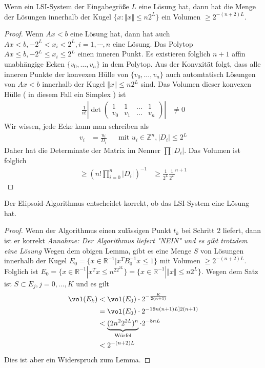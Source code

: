 \begin{lemma}
Wenn ein LSI-System der Eingabegröße $L$ eine Lösung hat, dann hat die Menge der Lösungen innerhalb der Kugel $\{x:\Vert x \Vert \leq n2^L \}$ ein Volumen $\geq 2^{-(n+2)L}$.
\end{lemma}
\begin{proof}
Wenn $Ax < b$ eine Lösung hat, dann hat auch $Ax<b, -2^L< x_i < 2^L, i = 1,\cdots,n$ eine Lösung.
Das Polytop $Ax \leq b, -2^L \leq x_i \leq 2^L$ einen inneren Punkt.
Es existieren folglich $n+1$ affin unabhängige Ecken $\{v_0,\dotsc, v_n\}$ in dem Polytop.
Aus der Konvxität folgt, dass alle inneren Punkte der konvexen Hülle von $\{v_0,\dotsc, v_n\}$ auch automtatisch Lösungen von $Ax < b$ innerhalb der Kugel $\Vert x \Vert \leq n2^L$ sind.
Das Volumen dieser konvexen Hülle ( in diesem Fall ein Simplex ) ist
\begin{align*}
\frac{1}{n!} \left \lvert \det \begin{pmatrix}
1 & 1 & \hdots &1 \\
v_0 & v_1 & \hdots & v_n 
\end{pmatrix} \right \rvert &\neq 0
\end{align*}
Wir wissen, jede Ecke kann man schreiben als
\begin{align*}
v_i &= \frac{u_i}{D_i} && \text{mit } u_i \in \mathbb Z^n, \lvert D_i \rvert \leq 2^L
\end{align*}
Daher hat die Determinate der Matrix im Nenner $\prod \lvert D_i \rvert$.
Das Volumen ist folglich 
\begin{align*}
\geq (n! \prod_{i=0}^n \lvert D_i \rvert )^{-1} &\geq \frac{1}{2^L}\frac{1}{2^L}^{n+1}
\end{align*}
\end{proof}
\begin{theorem}
Der Elipsoid-Algorithmus entscheidet korrekt, ob das LSI-System eine Lösung hat.
\end{theorem}
\begin{proof}
Wenn der Algorithmus einen zulässigen Punkt $t_k$ bei Schritt 2 liefert, dann ist er korrekt\newline
\emph{Annahme: Der Algorithmus liefert "NEIN" und es gibt trotzdem eine Lösung}\newline
Wegen dem obigen Lemma, gibt es eine Menge $S$ von Lösungen innerhalb der Kugel $E_0 = \{x\in \mathbb R^{-1} | x^TB_0^{-1} x\leq 1 \}$ mit Volumen $\geq 2^{-(n+2)L}$.
Folglich ist $E_0 = \{x\in \mathbb R^{-1} | x^Tx\leq n^22^{2L} \} = \{x\in \mathbb R^{-1} | \Vert x \Vert \leq n2^{L} \}$.
Wegen dem Satz ist $S \subset E_j , j = 0, \dotsc , K$ und es gilt 
\begin{align*}
\vol(E_k) &< \vol(E_0) \cdot 2^{-\frac{K}{2(n+1)}} \\
	&= \vol( E_0 ) \cdot 2^{-16n(n+1)L]{2(n+1)}} \\
	&< \underbrace{(2n^22^{2L})^n}_{\text{Würfel}} \cdot 2^{-8nL} \\
	&< 2^{-(n+2)L}
\end{align*}
Dies ist aber ein Widerspruch zum Lemma.
\end{proof}

